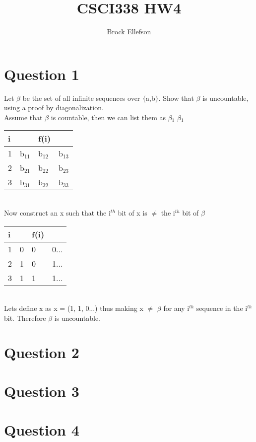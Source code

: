 \documentclass[10pt,a4paper]{article}
\author{Brock Ellefson}
\title{CSCI338 HW4}
\begin{document}
\maketitle
\section*{Question 1}
Let $\beta$ be the set of all infinite sequences over $\lbrace$a,b$\rbrace$. Show that $\beta$ is uncountable,
using a proof by diagonalization.\\
Assume that $\beta$ is countable, then we can list them as $\beta$$_{1}$ $\beta$$_{1}$
\begin{table}[h]
\centering
\begin{tabular}{l|lll}
i & {\ul } & f(i) &     \\ \hline
1 & b$_{11}$    & b$_{12}$  & b$_{13}$ \\
2 & b$_{21}$    & b$_{22}$  & b$_{23}$ \\
3 & b$_{31}$    & b$_{32}$  & b$_{33}$
\end{tabular}
\end{table}
\\Now construct an x such that the i$^{th}$ bit of x is $\neq$ the i$^{th}$ bit of $\beta$
\begin{table}[h]
\centering
\begin{tabular}{l|lll}
i & {\ul } & f(i) &   \\ \hline
1 & 0      & 0 & 0... \\
2 & 1      & 0 & 1... \\
3 & 1      & 1 & 1...
\end{tabular}
\end{table}
\\Lets define x as x = (1, 1, 0...) thus making x $\neq$ $\beta$ for any i$^{th}$ sequence in the i$^{th}$ bit. Therefore $\beta$ is uncountable.

\section*{Question 2}

\section*{Question 3}
\section*{Question 4}
\end{document}
